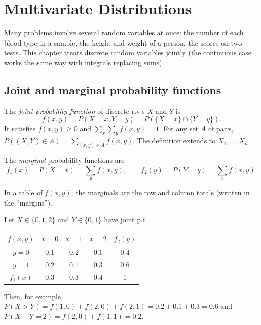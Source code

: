 \chapter{Multivariate Distributions}

Many problems involve several random variables at once: the number of each blood type in
a sample, the height and weight of a person, the scores on two tests. This chapter treats
discrete random variables jointly (the continuous case works the same way with integrals
replacing sums).

\section{Joint and marginal probability functions}

\begin{definition}[Joint p.f.]
The \emph{joint probability function} of discrete r.v.s $X$ and $Y$ is
\[
  f(x,y) = P(X = x, Y = y) = P(\{X=x\}\cap\{Y=y\}).
\]
It satisfies $f(x,y)\ge 0$ and $\sum_x\sum_y f(x,y) = 1$. For any set $A$ of pairs,
$P((X,Y)\in A) = \sum_{(x,y)\in A} f(x,y)$. The definition extends to $X_1,\dots,X_n$.
\end{definition}

\begin{definition}[Marginal p.f.]
The \emph{marginal} probability functions are
\[
  f_1(x) = P(X = x) = \sum_y f(x,y), \qquad f_2(y) = P(Y=y) = \sum_x f(x,y).
\]
\end{definition}

In a table of $f(x,y)$, the marginals are the row and column totals (written in the
``margins'').

\begin{example}
Let $X\in\{0,1,2\}$ and $Y\in\{0,1\}$ have joint p.f.

\begin{center}
\begin{tabular}{c|ccc|c}
$f(x,y)$ & $x=0$ & $x=1$ & $x=2$ & $f_2(y)$ \\
\hline
$y=0$ & $0.1$ & $0.2$ & $0.1$ & $0.4$ \\
$y=1$ & $0.2$ & $0.1$ & $0.3$ & $0.6$ \\
\hline
$f_1(x)$ & $0.3$ & $0.3$ & $0.4$ & $1$ \\
\end{tabular}
\end{center}

Then, for example, $P(X > Y) = f(1,0) + f(2,0) + f(2,1) = 0.2 + 0.1 + 0.3 = 0.6$ and
$P(X+Y = 2) = f(2,0) + f(1,1) = 0.2$.
\end{example}

